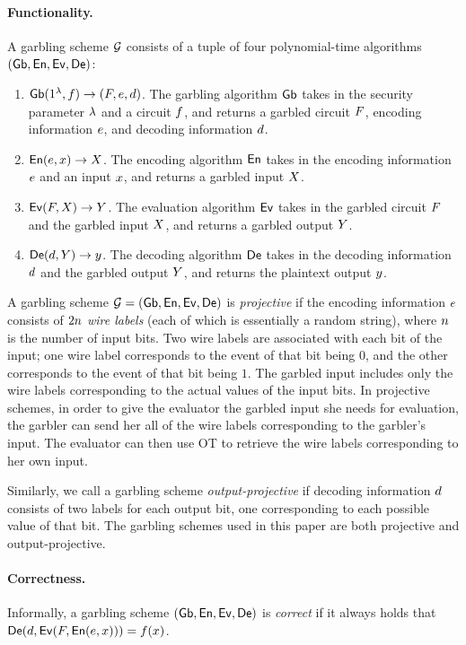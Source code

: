 \paragraph{Functionality.}

A garbling scheme $\mathcal{G}$ consists of a tuple of four polynomial-time algorithms $(\mathsf{Gb}, \mathsf{En}, \mathsf{Ev}, \mathsf{De})$:
\begin{enumerate}
\item $\mathsf{Gb}(1^{\lambda}, f) \to (F, e, d)$.
The garbling algorithm $\mathsf{Gb}$ 
takes in the security parameter $\lambda$ and a circuit $f$, 
and returns a garbled circuit $F$, encoding information $e$,
and decoding information $d$.
\item $\mathsf{En}(e, x) \to X$.
The encoding algorithm $\mathsf{En}$ takes in the encoding information $e$ and an input $x$, and returns a garbled input $X$.
\item $\mathsf{Ev}(F, X) \to Y$.
The evaluation algorithm $\mathsf{Ev}$ takes in the garbled circuit $F$ and the garbled input $X$, and returns a garbled output $Y$.
\item $\mathsf{De}(d, Y) \to y$.
The decoding algorithm $\mathsf{De}$ takes in the decoding information $d$ and the garbled output $Y$, and returns the plaintext output $y$.
\end{enumerate}
A garbling scheme $\mathcal{G} = (\mathsf{Gb}, \mathsf{En}, \mathsf{Ev}, \mathsf{De})$ is \emph{projective} if the encoding information $e$ consists of $2 n$ \emph{wire labels} (each of which is essentially a random string), where $n$ is the number of input bits. 
Two wire labels are associated with each bit of the input; one wire label corresponds to the event of that bit being $0$, and the other corresponds to the event of that bit being $1$.
The garbled input includes only the wire labels corresponding to the actual values of the input bits.
In projective schemes, in order to give the evaluator the garbled input she needs for evaluation,
the garbler can send her all of the wire labels corresponding to the garbler's input.
The evaluator can then use OT to retrieve the wire labels corresponding to her own input. 

Similarly, we call a garbling scheme \emph{output-projective} if decoding information $d$ consists of two labels for each output bit, one corresponding to each possible value of that bit.
The garbling schemes used in this paper are both projective and output-projective.

\paragraph{Correctness.}
Informally, a garbling scheme $(\mathsf{Gb}, \mathsf{En}, \mathsf{Ev}, \mathsf{De})$ is \emph{correct} if it always holds that $\mathsf{De}(d, \mathsf{Ev}(F, \mathsf{En}(e, x))) = f(x)$.

